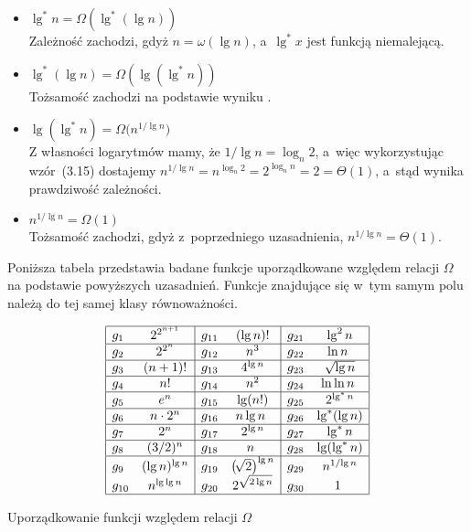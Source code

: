 \begin{itemize}
\item $\lg^*n=\Omega(\lg^*(\lg n))$ \\
	Zależność zachodzi, gdyż $n=\omega(\lg n)$, a~$\lg^*x$ jest funkcją niemalejącą.
\item $\lg^*(\lg n)=\Omega(\lg(\lg^*n))$ \\
	Tożsamość zachodzi na podstawie wyniku .
\item $\lg(\lg^*n)=\Omega\bigl(n^{1/\!\lg n}\bigr)$ \\
	Z własności logarytmów mamy, że $1/\!\lg n=\log_n2$, a~więc wykorzystując wzór~(3.15) dostajemy $n^{1/\!\lg n}=n^{\log_n2}=2^{\log_nn}=2=\Theta(1)$, a~stąd wynika prawdziwość zależności.
\item $n^{1/\!\lg n}=\Omega(1)$ \\
	Tożsamość zachodzi, gdyż z~poprzedniego uzasadnienia, $n^{1/\!\lg n}=\Theta(1)$.
\end{itemize}

Poniższa tabela przedstawia badane funkcje uporządkowane względem relacji $\Omega$ na podstawie powyższych uzasadnień. Funkcje znajdujące się w~tym samym polu należą do tej samej klasy równoważności.
\begin{table}[ht]
	\begin{center}
		\[
			\begin{array}{|lc|lc|lc|} \hline
				g_1 & 2^{2^{n+1}} & g_{11} & (\lg n)! & g_{21} & \lg^2n \\ \hline
				g_2 & 2^{2^n} & g_{12} & n^3 & g_{22} & \ln n~\\ \hline
				g_3 & (n+1)! & g_{13} & 4^{\lg n} & g_{23} & \sqrt{\lg n} \\ \hline
				g_4 & n! & g_{14} & n^2 & g_{24} & \ln\ln n~\\ \hline
				g_5 & e^n & g_{15} & \lg (n!) & g_{25} & 2^{\lg^*n} \\ \hline
				g_6 & n\cdot2^n & g_{16} & n\lg n~& g_{26} & \lg^*(\lg n) \\ \hline
				g_7 & 2^n & g_{17} & 2^{\lg n} & g_{27} & \lg^*n \\ \hline
				g_8 & (3/2)^n & g_{18} & n~& g_{28} & \lg(\lg^*n) \\ \hline
				g_9 & (\lg n)^{\lg n} & g_{19} & \bigl(\!\sqrt{2}\bigr)^{\lg n} & g_{29} & n^{1/\!\lg n} \\
				g_{10} & n^{\lg\lg n} & g_{20} & 2^{\sqrt{2\lg n}} & g_{30} & 1~\\ \hline
			\end{array}
		\]
	\end{center}
	\caption{Uporządkowanie funkcji względem relacji $\Omega$}
\end{table}

